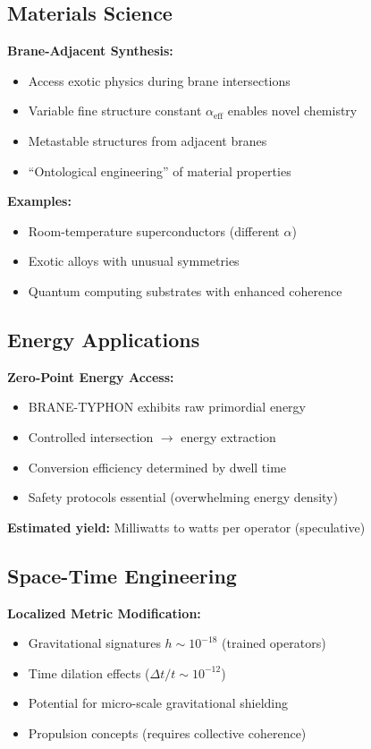 \subsection{Materials Science}
\label{subsec:app-materials}

\textbf{Brane-Adjacent Synthesis:}
\begin{itemize}
\item Access exotic physics during brane intersections
\item Variable fine structure constant $\alpha_{\text{eff}}$ enables novel chemistry
\item Metastable structures from adjacent branes
\item ``Ontological engineering'' of material properties
\end{itemize}

\textbf{Examples:}
\begin{itemize}
\item Room-temperature superconductors (different $\alpha$)
\item Exotic alloys with unusual symmetries
\item Quantum computing substrates with enhanced coherence
\end{itemize}

\subsection{Energy Applications}
\label{subsec:app-energy}

\textbf{Zero-Point Energy Access:}
\begin{itemize}
\item BRANE-TYPHON exhibits raw primordial energy
\item Controlled intersection $\rightarrow$ energy extraction
\item Conversion efficiency determined by dwell time
\item Safety protocols essential (overwhelming energy density)
\end{itemize}

\textbf{Estimated yield:} Milliwatts to watts per operator (speculative)

\subsection{Space-Time Engineering}
\label{subsec:app-spacetime}

\textbf{Localized Metric Modification:}
\begin{itemize}
\item Gravitational signatures $h \sim 10^{-18}$ (trained operators)
\item Time dilation effects ($\Delta t/t \sim 10^{-12}$)
\item Potential for micro-scale gravitational shielding
\item Propulsion concepts (requires collective coherence)
\end{itemize}

